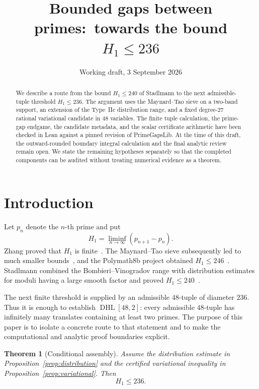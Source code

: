 \documentclass[11pt]{amsart}
\title[Bounded gaps between primes]{Bounded gaps between primes:\
towards the bound $H_1\leq236$}
\author{\NoCaseChange{Roy van Rijn}}
\date{Working draft, 3 September 2026}
\newtheorem{theorem}{Theorem}[section]
\theoremstyle{definition}
\newcommand{\DHL}{\operatorname{DHL}}
\begin{document}
\begin{abstract}
We describe a route from the bound $H_1\leq240$ of Stadlmann to the next
admissible-tuple threshold $H_1\leq236$.  The argument uses the Maynard--Tao
sieve on a two-band support, an extension of the Type~IIc distribution range,
and a fixed degree-$27$ rational variational candidate in $48$ variables.  The
finite tuple calculation, the prime-gap endgame, the candidate metadata, and
the scalar certificate arithmetic have been checked in Lean against a pinned
revision of PrimeGapsLib.  At the time of this draft, the outward-rounded
boundary integral calculation and the final analytic review remain open.  We
state the remaining hypotheses separately so that the completed components can
be audited without treating numerical evidence as a theorem.
\end{abstract}

\maketitle

\section{Introduction}\label{sec:introduction}

Let $p_n$ denote the $n$-th prime and put
\[
  H_1=\liminf_{n\to\infty}(p_{n+1}-p_n).
\]
Zhang proved that $H_1$ is finite~\cite{Zhang2014}.  The Maynard--Tao sieve
subsequently led to much smaller bounds~\cite{Maynard2015}, and the Polymath8b
project obtained $H_1\leq246$~\cite{PolymathVSS}.  Stadlmann combined the
Bombieri--Vinogradov range with distribution estimates for moduli having a
large smooth factor and proved $H_1\leq240$~\cite{Stadlmann2026}.

The next finite threshold is supplied by an admissible $48$-tuple of diameter
$236$.  Thus it is enough to establish $\DHL[48,2]$: every admissible
$48$-tuple has infinitely many translates containing at least two primes.  The
purpose of this paper is to isolate a concrete route to that statement and to
make the computational and analytic proof boundaries explicit.

\begin{theorem}[Conditional assembly]\label{thm:conditional}
Assume the distribution estimate in Proposition~\ref{prop:distribution} and
the certified variational inequality in Proposition~\ref{prop:variational}.
Then
\[
  H_1\leq236.
\]
\end{theorem}
\end{document}
